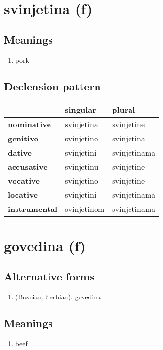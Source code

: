 \filbreak
\section{svinjetina (f)}
\subsection*{Meanings}
\begin{enumerate}
\item pork
\end{enumerate}
\subsection*{Declension pattern}
\begin{tabularx}{\linewidth}{Xll}
\toprule
{} &     singular &        plural \\
\midrule
\textbf{nominative  } &   svinjetina &    svinjetine \\
\textbf{genitive    } &   svinjetine &    svinjetina \\
\textbf{dative      } &   svinjetini &  svinjetinama \\
\textbf{accusative  } &   svinjetinu &    svinjetine \\
\textbf{vocative    } &   svinjetino &    svinjetine \\
\textbf{locative    } &   svinjetini &  svinjetinama \\
\textbf{instrumental} &  svinjetinom &  svinjetinama \\
\bottomrule
\end{tabularx}

\filbreak
\section{govedina (f)}
\subsection*{Alternative forms}
\begin{enumerate}
\item (Bosnian, Serbian): goveđina
\end{enumerate}
\subsection*{Meanings}
\begin{enumerate}
\item beef
\end{enumerate}

